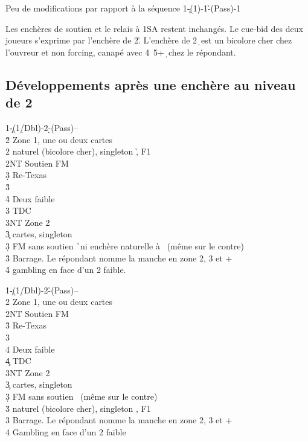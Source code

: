 \documentclass[a4paper]{article}
\begin{document}
Peu de modifications par rapport à la séquence
1\c -(1\d )-1\h -(Pass)-1\s 

Les enchères de soutien et le relais à 1SA restent inchangés.
Le cue-bid des deux joueurs s’exprime par l’enchère de 2\h .
L’enchère de 2\d\ est un bicolore cher chez l’ouvreur et non forcing, canapé avec 4\s\ 5+\d\ chez le 
répondant.

\subsection{Développements après une enchère au niveau de 2}

\begin{bidtable}
1\c-(1\d/Dbl)-2\d-(Pass)--\\
2\h \> Zone 1, une ou deux cartes\\
2\s \> naturel (bicolore cher), singleton \h , F1\\
2NT \> Soutien FM\+\\
3\d \> Re-Texas\+\\
3\h\+\\
4\h \> Deux faible\\
3\s \> TDC\\
3NT \> Zone 2\-\-\-\\
3\c {} cartes, singleton \h \\
3\d \> FM sans soutien \h\ ni enchère naturelle à \s\ (même sur le contre)\\
3\h \> Barrage. Le répondant nomme la manche en zone 2, 3 et +\\
4\h \> gambling en face d'un 2 faible.
\end{bidtable}

\begin{bidtable}
1\c-(1\d/Dbl)-2\h-(Pass)--\\
2\s \> Zone 1, une ou deux cartes\\
2NT \> Soutien FM\+\\
3\h \> Re-Texas\+\\
3\s\+\\
4\s \> Deux faible\\
4\c \> TDC\\
3NT \> Zone 2\-\-\-\\
3\c {} cartes, singleton \s \\
3\d \> FM sans soutien \s\ (même sur le contre)\\
3\h \> naturel (bicolore cher), singleton \s , F1\\
3\s \> Barrage. Le répondant nomme la manche en zone 2, 3 et +\\
4\s \> Gambling en face d'un 2 faible
\end{bidtable}
\end{document}
